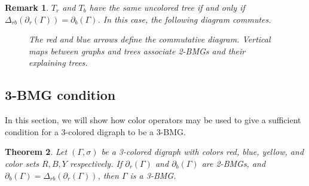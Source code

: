 \documentclass[final,3p,times]{elsarticle}
\newtheorem{theorem}{Theorem}[section]
\newtheorem{remark}[theorem]{Remark}%
\begin{document}
\begin{remark}
\label{obs:delta_operator}
$T_r$ and $T_b$ have the same uncolored tree if and only if $\Delta_{rb}(\partial_r(\Gamma))=\partial_b(\Gamma)$. In this case, the following diagram commutes.
\begin{figure}[ht]
  \centering
{}
\caption{The red and blue arrows define the commutative diagram. Vertical maps between graphs and trees associate 2-BMGs and their explaining trees.}
\label{fig:diagram}
\end{figure}
\end{remark}

\subsection{3-BMG condition}
\label{sec:3-BMG condition}
In this section, we will show how color operators may be used to give a sufficient condition for a 3-colored digraph to be a 3-BMG.

\begin{theorem}\label{thm:sufficient_condition}
Let $(\Gamma,\sigma)$ be a 3-colored digraph with colors red, blue, yellow, and color sets $R,B,Y$ respectively. If $\partial_r(\Gamma)$ and $\partial_b(\Gamma)$ are 2-BMGs, and $\partial_b(\Gamma)=\Delta_{rb}(\partial_r(\Gamma))$, then $\Gamma$ is a 3-BMG.
\end{theorem}
\end{document}
